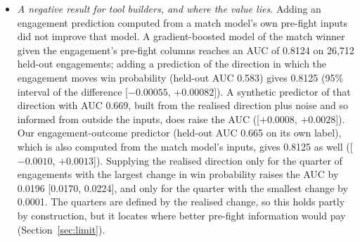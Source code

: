 \begin{itemize}
\item \emph{A negative result for tool builders, and where the value lies.} Adding an engagement
  prediction computed from a match model's own pre-fight inputs did not improve that model. A
  gradient-boosted model of the match winner given the engagement's pre-fight columns reaches an AUC
  of 0.8124 on 26,712 held-out engagements; adding a prediction of the direction in which the
  engagement moves win probability (held-out AUC 0.583) gives 0.8125 (95\% interval of the difference
  [$-0.00055$, $+0.00082$]). A synthetic predictor of that direction with AUC 0.669, built from the
  realised direction plus noise and so informed from outside the inputs, does raise the AUC
  ([$+0.0008$, $+0.0028$]). Our engagement-outcome predictor (held-out AUC 0.665 on its own label), which
  is also computed from the match model's inputs, gives 0.8125 as well ([$-0.0010$, $+0.0013$]).
  Supplying the realised
  direction only for the quarter of engagements with the largest change in win probability raises the
  AUC by 0.0196 [0.0170, 0.0224], and only for the quarter with the smallest change by 0.0001. The
  quarters are defined by the realised change, so this holds partly by construction, but it locates
  where better pre-fight information would pay (Section~\ref{sec:limit}).
\end{itemize}


